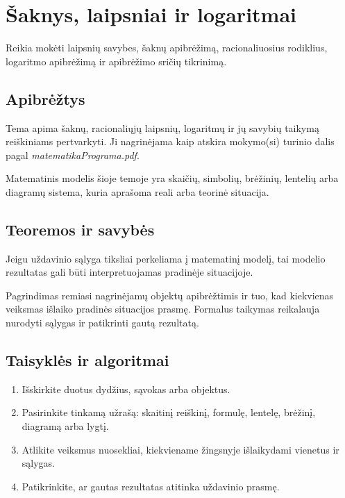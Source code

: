 \section{Šaknys, laipsniai ir logaritmai}\label{sec:saknys-laipsniai-ir-logaritmai}

\begin{tcolorbox}[title=Prieš pradedant, colback=green!5]
Reikia mokėti laipsnių savybes, šaknų apibrėžimą, racionaliuosius rodiklius, logaritmo apibrėžimą ir apibrėžimo sričių tikrinimą.
\end{tcolorbox}
\subsection{Apibrėžtys}
\begin{apibreztis}
Tema apima šaknų, racionaliųjų laipsnių, logaritmų ir jų savybių taikymą reiškiniams pertvarkyti. Ji nagrinėjama kaip atskira mokymo(si) turinio dalis pagal \emph{matematikaPrograma.pdf}.
\end{apibreztis}
\begin{apibreztis}
Matematinis modelis šioje temoje yra skaičių, simbolių, brėžinių, lentelių arba diagramų sistema, kuria aprašoma reali arba teorinė situacija.
\end{apibreztis}

\subsection{Teoremos ir savybės}
\begin{savybe}
Jeigu uždavinio sąlyga tiksliai perkeliama į matematinį modelį, tai modelio rezultatas gali būti interpretuojamas pradinėje situacijoje.
\end{savybe}
\begin{pastaba}
Pagrindimas remiasi nagrinėjamų objektų apibrėžtimis ir tuo, kad kiekvienas veiksmas išlaiko pradinės situacijos prasmę. Formalus taikymas reikalauja nurodyti sąlygas ir patikrinti gautą rezultatą.
\end{pastaba}

\subsection{Taisyklės ir algoritmai}
\begin{enumerate}[label=\arabic*.]
\item Išskirkite duotus dydžius, sąvokas arba objektus.
\item Pasirinkite tinkamą užrašą: skaitinį reiškinį, formulę, lentelę, brėžinį, diagramą arba lygtį.
\item Atlikite veiksmus nuosekliai, kiekviename žingsnyje išlaikydami vienetus ir sąlygas.
\item Patikrinkite, ar gautas rezultatas atitinka uždavinio prasmę.
\end{enumerate}

